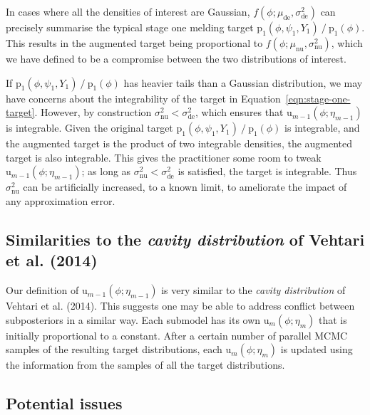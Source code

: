 \documentclass[10pt,a4paper,]{article}
\newcommand{\pd}{\text{p}}
\newcommand{\tarw}{\text{u}}
\newcommand{\modelindex}{m}
\begin{document}
In cases where all the densities of interest are Gaussian,
\(f(\phi; \mu_{\text{de}}, \sigma^2_{\text{de}})\) can precisely
summarise the typical stage one melding target
\(\pd_{1}(\phi, \psi_{1}, Y_{1}) \mathop{/} \pd_{1}(\phi)\). This
results in the augmented target being proportional to
\(f(\phi; \mu_{\text{nu}}, \sigma^2_{\text{nu}})\), which we have
defined to be a compromise between the two distributions of interest.

If \(\pd_{1}(\phi, \psi_{1}, Y_{1}) \mathop{/} \pd_{1}(\phi)\) has
heavier tails than a Gaussian distribution, we may have concerns about
the integrability of the target in
Equation~\eqref{eqn:stage-one-target}. However, by construction
\(\sigma_{\text{nu}}^{2} < \sigma_{\text{de}}^{2}\), which ensures that
\(\tarw_{\modelindex - 1}(\phi; \eta_{\modelindex - 1})\) is integrable.
Given the original target
\(\pd_{1}(\phi, \psi_{1}, Y_{1}) \mathop{/} \pd_{1}(\phi)\) is
integrable, and the augmented target is the product of two integrable
densities, the augmented target is also integrable. This gives the
practitioner some room to tweak
\(\tarw_{\modelindex - 1}(\phi; \eta_{\modelindex - 1})\); as long as
\(\sigma_{\text{nu}}^{2} < \sigma_{\text{de}}^{2}\) is satisfied, the
target is integrable. Thus \(\sigma_{\text{nu}}^{2}\) can be
artificially increased, to a known limit, to ameliorate the impact of
any approximation error.

\subsection{\texorpdfstring{Similarities to the \emph{cavity
distribution} of Vehtari et al.
(2014)}{Similarities to the cavity distribution of Vehtari et al. (2014)}}\label{similarities-to-the-cavity-distribution-of-vehtarietal14}

Our definition of
\(\tarw_{\modelindex - 1}(\phi; \eta_{\modelindex - 1})\) is very
similar to the \emph{cavity distribution} of Vehtari et al. (2014). This
suggests one may be able to address conflict between subposteriors in a
similar way. Each submodel has its own
\(\tarw_{\modelindex}(\phi; \eta_{\modelindex})\) that is initially
proportional to a constant. After a certain number of parallel MCMC
samples of the resulting target distributions, each
\(\tarw_{\modelindex}(\phi; \eta_{\modelindex})\) is updated using the
information from the samples of all the target distributions.

\subsection{Potential issues}\label{potential-issues}
\end{document}

